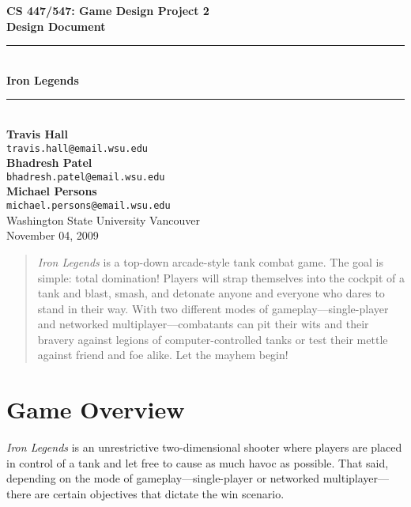 \documentclass[letterpaper,11pt,twoside]{article}
\begin{document}
\begin{titlepage}
   \begin{center}
       {\large \textbf{CS 447/547: Game Design Project 2}}\\[0.5cm]
       {\large \textbf{Design Document}}\\[3.0cm]

       {\rule{\linewidth}{0.5mm}} \\[0.5cm]
       {\Huge \textbf{Iron Legends}}\\[0.4cm] 
       {\rule{\linewidth}{0.5mm}} \\[2.0cm]

       \textbf{Travis Hall}\\
       \texttt{travis.hall@email.wsu.edu}\\[0.5cm]
       \textbf{Bhadresh Patel}\\
       \texttt{bhadresh.patel@email.wsu.edu}\\[0.5cm]
       \textbf{Michael Persons}\\
       \texttt{michael.persons@email.wsu.edu}\\[0.5cm]

       \vfill
       Washington State University Vancouver\\
       November 04, 2009
   \end{center}
\end{titlepage}

\begin{abstract}
\emph{Iron Legends} is a top-down arcade-style tank combat game. The goal is simple: total domination! Players will strap themselves into the cockpit of a tank and blast, smash, and detonate anyone and everyone who dares to stand in their way. With two different modes of gameplay–--single-player and networked multiplayer--–combatants can pit their wits and their bravery against legions of computer-controlled tanks or test their mettle against friend and foe alike. Let the mayhem begin!
\end{abstract}

\section{Game Overview}

\emph{Iron Legends} is an unrestrictive two-dimensional shooter where players are placed in control of a tank and let free to cause as much havoc as possible. That said, depending on the mode of gameplay---single-player or networked multiplayer---there are certain objectives that dictate the win scenario.
\end{document}
